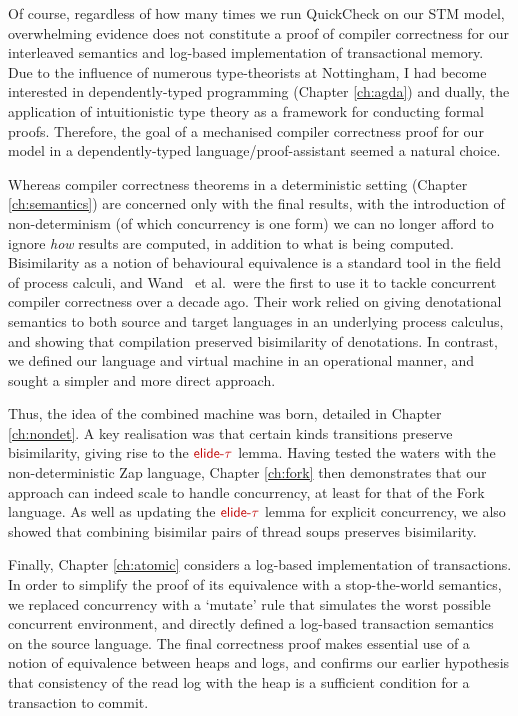 Of course, regardless of how many times we run QuickCheck on our STM model,
overwhelming evidence does not constitute a proof of compiler correctness
for our interleaved semantics and log-based implementation of transactional
memory. Due to the influence of numerous type-theorists at Nottingham, I had
become interested in dependently-typed programming (Chapter \ref{ch:agda})
and dually, the application of intuitionistic type theory as a framework for
conducting formal proofs. Therefore, the goal of a mechanised compiler
correctness proof for our model in a dependently-typed
language/proof-assistant seemed a natural choice.

Whereas compiler correctness theorems in a deterministic setting (Chapter
\ref{ch:semantics}) are concerned only with the final results, with the
introduction of non-determinism (of which concurrency is one form) we can no
longer afford to ignore \emph{how} results are computed, in addition to what
is being computed. Bisimilarity as a notion of behavioural equivalence is
a standard tool in the field of process calculi, and
Wand~\cite{wand95-parallel,wand95-denotational,gladstein96-concurrent} et
al.~were the first to use it to tackle concurrent compiler correctness over
a decade ago. Their work relied on giving denotational semantics to both
source and target languages in an underlying process calculus, and showing
that compilation preserved bisimilarity of denotations. In contrast, we
defined our language and virtual machine in an operational manner, and
sought a simpler and more direct approach.

Thus, the idea of the combined machine was born, detailed in Chapter
\ref{ch:nondet}. A key realisation was that certain kinds transitions
preserve bisimilarity, giving rise to the $\func{elide\text-\tau}$ lemma.
Having tested the waters with the non-deterministic Zap language, Chapter
\ref{ch:fork} then demonstrates that our approach can indeed scale to handle
concurrency, at least for that of the Fork language. As well as updating the
$\func{elide\text-\tau}$ lemma for explicit concurrency, we also showed that
combining bisimilar pairs of thread soups preserves bisimilarity.

Finally, Chapter \ref{ch:atomic} considers a log-based implementation of
transactions. In order to simplify the proof of its equivalence with
a stop-the-world semantics, we replaced concurrency with a `mutate' rule
that simulates the worst possible concurrent environment, and directly
defined a log-based transaction semantics on the source language. The final
correctness proof makes essential use of a notion of equivalence between
heaps and logs, and confirms our earlier hypothesis that consistency of the
read log with the heap is a sufficient condition for a transaction to
commit.

